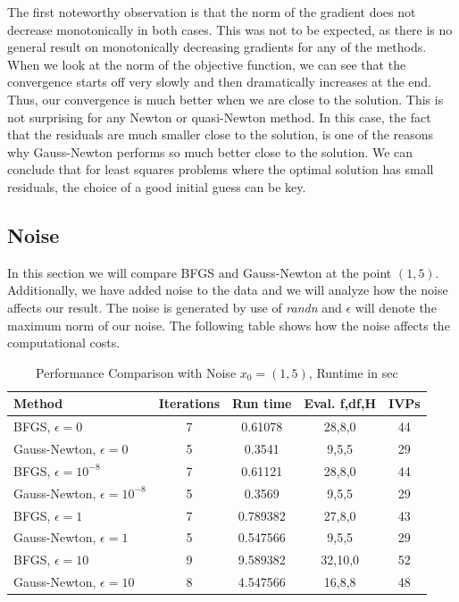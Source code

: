 \documentclass{article}
\begin{document}
The first noteworthy observation is that the norm of the gradient does not decrease monotonically
in both cases. This was not to be expected, as there is no general result on monotonically
decreasing gradients for any of the methods. When we look at the norm of the objective function,
we can see that the convergence starts off very slowly and then dramatically increases at the end.
Thus, our convergence is much better when we are close to the solution. This is not surprising
for any Newton or quasi-Newton method. In this case, the fact that the residuals are much smaller
close to the solution, is one of the reasons why Gauss-Newton performs so much better close to the solution. We can conclude that for least squares problems where the optimal solution has small residuals, the choice of a good initial guess can be key.
\subsection{Noise}
In this section we will compare BFGS and Gauss-Newton at the point $(1,5)$.
Additionally, we have added noise to the data and we will analyze how the noise
affects our result. The noise is generated by use of \emph{randn} and $\epsilon$ will
denote the maximum norm of our noise. The following table shows how the noise affects the
computational costs.
\begin{table}[H]
  \centering
  \begin{tabular}{|l|c|c|c|c|}
    \hline
   \textbf{Method} & \textbf{Iterations} & \textbf{Run time}&\textbf{Eval. f,df,H} &\textbf{IVPs} \\ \hline \hline
  BFGS, $\epsilon=0$ &7 &0.61078 &28,8,0&44 \\ \hline
  Gauss-Newton, $\epsilon=0$ &5 &0.3541 &9,5,5&29 \\ \hline \hline
  BFGS, $\epsilon=10^{-8}$ &7 &0.61121 &28,8,0&44 \\ \hline
  Gauss-Newton, $\epsilon=10^{-8}$&5 &0.3569 &9,5,5 &29 \\ \hline \hline
 BFGS, $\epsilon=1$ &7 &0.789382 &27,8,0&43 \\ \hline
  Gauss-Newton, $\epsilon=1$ &5 &0.547566 &9,5,5&29 \\ \hline \hline
 BFGS, $\epsilon=10$ &9 &9.589382 &32,10,0&52 \\ \hline
  Gauss-Newton, $\epsilon=10$ &8 &4.547566 &16,8,8&48 \\ \hline 
  \end{tabular}
  \caption{Performance Comparison with Noise $x_{0}=(1,5)$, Runtime in sec}
  \label{tab:perform}
\end{table}
\end{document}
